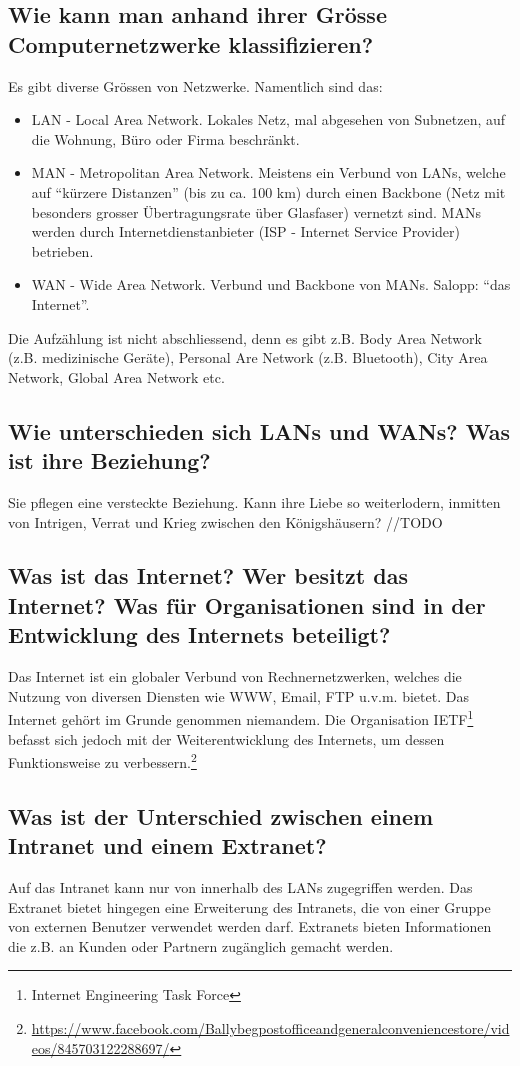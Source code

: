 \subsection*{Wie kann man anhand ihrer Grösse Computernetzwerke klassifizieren?}
Es gibt diverse Grössen von Netzwerke. Namentlich sind das:
\begin{itemize}
    \item LAN - Local Area Network. Lokales Netz, mal abgesehen von Subnetzen, auf die Wohnung, Büro oder Firma beschränkt.
    \item MAN - Metropolitan Area Network. Meistens ein Verbund von LANs, welche auf ``kürzere Distanzen'' (bis zu ca. 100 km) durch einen Backbone (Netz mit besonders grosser Übertragungsrate über Glasfaser) vernetzt sind. MANs werden durch Internetdienstanbieter (ISP - Internet Service Provider) betrieben.
    \item WAN - Wide Area Network. Verbund und Backbone von MANs. Salopp: ``das Internet''.
\end{itemize}
Die Aufzählung ist nicht abschliessend, denn es gibt z.B. Body Area Network (z.B. medizinische Geräte), Personal Are Network (z.B. Bluetooth), City Area Network, Global Area Network etc.
\subsection*{Wie unterschieden sich LANs und WANs? Was ist ihre Beziehung?}
Sie pflegen eine versteckte Beziehung. Kann ihre Liebe so weiterlodern, inmitten von Intrigen, Verrat und Krieg zwischen den Königshäusern? //TODO
\subsection*{Was ist das Internet? Wer besitzt das Internet? Was für Organisationen sind in der Entwicklung des Internets beteiligt?}
Das Internet ist ein globaler Verbund von Rechnernetzwerken, welches die Nutzung von diversen Diensten wie WWW, Email, FTP u.v.m. bietet. Das Internet gehört im Grunde genommen niemandem. Die Organisation IETF\footnote{Internet Engineering Task Force} befasst sich jedoch mit der Weiterentwicklung des Internets, um dessen Funktionsweise zu verbessern.\footnote{\url{https://www.facebook.com/Ballybegpostofficeandgeneralconveniencestore/videos/845703122288697/}}
\subsection*{Was ist der Unterschied zwischen einem Intranet und einem Extranet?}
Auf das Intranet kann nur von innerhalb des LANs zugegriffen werden. Das Extranet bietet hingegen eine Erweiterung des Intranets, die von einer Gruppe von externen Benutzer verwendet werden darf. Extranets bieten Informationen die z.B. an Kunden oder Partnern zugänglich gemacht werden.
